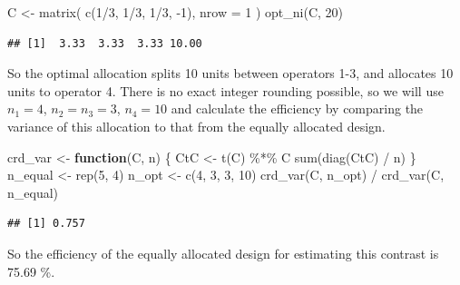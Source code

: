 \documentclass[
]{book}
\newenvironment{Shaded}{\begin{snugshade}}{\end{snugshade}}
\newcommand{\AttributeTok}[1]{\textcolor[rgb]{0.77,0.63,0.00}{#1}}
\newcommand{\ControlFlowTok}[1]{\textcolor[rgb]{0.13,0.29,0.53}{\textbf{#1}}}
\newcommand{\DecValTok}[1]{\textcolor[rgb]{0.00,0.00,0.81}{#1}}
\newcommand{\FunctionTok}[1]{\textcolor[rgb]{0.00,0.00,0.00}{#1}}
\newcommand{\NormalTok}[1]{#1}
\newcommand{\OtherTok}[1]{\textcolor[rgb]{0.56,0.35,0.01}{#1}}
\newcommand{\SpecialCharTok}[1]{\textcolor[rgb]{0.00,0.00,0.00}{#1}}
\theoremstyle{definition}
\theoremstyle{definition}
\theoremstyle{definition}
\theoremstyle{definition}
\theoremstyle{remark}
\begin{document}
\begin{enumerate}
\begin{Shaded}
\begin{Highlighting}[]
\NormalTok{C }\OtherTok{\textless{}{-}} \FunctionTok{matrix}\NormalTok{(}
  \FunctionTok{c}\NormalTok{(}\DecValTok{1}\SpecialCharTok{/}\DecValTok{3}\NormalTok{, }\DecValTok{1}\SpecialCharTok{/}\DecValTok{3}\NormalTok{, }\DecValTok{1}\SpecialCharTok{/}\DecValTok{3}\NormalTok{, }\SpecialCharTok{{-}}\DecValTok{1}\NormalTok{),}
  \AttributeTok{nrow =} \DecValTok{1}
\NormalTok{)}
\FunctionTok{opt\_ni}\NormalTok{(C, }\DecValTok{20}\NormalTok{)}
\end{Highlighting}
\end{Shaded}

\begin{verbatim}
## [1]  3.33  3.33  3.33 10.00
\end{verbatim}

  So the optimal allocation splits 10 units between operators 1-3, and allocates 10 units to operator 4. There is no exact integer rounding possible, so we will use \(n_1 = 4\), \(n_2=n_3 = 3\), \(n_4 = 10\) and calculate the efficiency by comparing the variance of this allocation to that from the equally allocated design.

\begin{Shaded}
\begin{Highlighting}[]
\NormalTok{crd\_var }\OtherTok{\textless{}{-}} \ControlFlowTok{function}\NormalTok{(C, n) \{}
\NormalTok{  CtC }\OtherTok{\textless{}{-}} \FunctionTok{t}\NormalTok{(C) }\SpecialCharTok{\%*\%}\NormalTok{ C}
  \FunctionTok{sum}\NormalTok{(}\FunctionTok{diag}\NormalTok{(CtC) }\SpecialCharTok{/}\NormalTok{ n)}
\NormalTok{\} }
\NormalTok{n\_equal }\OtherTok{\textless{}{-}} \FunctionTok{rep}\NormalTok{(}\DecValTok{5}\NormalTok{, }\DecValTok{4}\NormalTok{)}
\NormalTok{n\_opt }\OtherTok{\textless{}{-}} \FunctionTok{c}\NormalTok{(}\DecValTok{4}\NormalTok{, }\DecValTok{3}\NormalTok{, }\DecValTok{3}\NormalTok{, }\DecValTok{10}\NormalTok{)}
\FunctionTok{crd\_var}\NormalTok{(C, n\_opt) }\SpecialCharTok{/} \FunctionTok{crd\_var}\NormalTok{(C, n\_equal)}
\end{Highlighting}
\end{Shaded}

\begin{verbatim}
## [1] 0.757
\end{verbatim}

  So the efficiency of the equally allocated design for estimating this contrast is 75.69 \%.
\end{enumerate}
\end{document}
